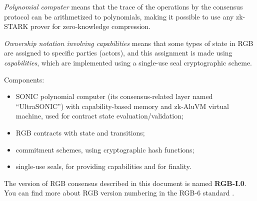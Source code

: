 \documentclass[9pt,oneside]{amsart}
\begin{document}
\begin{multicols}{2}
\emph{Polynomial computer} means that the trace of the operations by the consensus protocol
can be arithmetized to polynomials,
making it possible to use any zk-STARK prover for zero-knowledge compression.

\emph{Ownership notation involving capabilities} means that some types of state in RGB
are assigned to specific parties (actors), and this assignment is made using \emph{capabilities},
which are implemented using a single-use seal cryptographic scheme.

Components:
\begin{itemize}
  \item SONIC polynomial computer (its consensus-related layer named ``UltraSONIC'')
  with capability-based memory and zk-AluVM virtual machine,
  used for contract state evaluation/validation;
  \item RGB contracts with state and transitions;
  \item commitment schemes, using cryptographic hash functions;
  \item single-use seals, for providing capabilities and for finality.
\end{itemize}

The version of RGB consensus described in this document is named \textbf{RGB-I.0}.
You can find more about RGB version numbering in the RGB-6 standard \cite{RGB6}.

\end{multicols}
\end{document}
